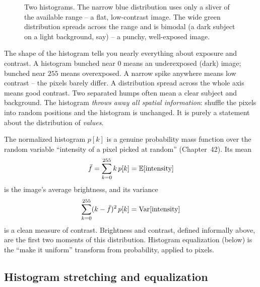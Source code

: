 \begin{figure}[H]
\centering
{}
\caption{Two histograms. The narrow blue distribution uses only a sliver of the
available range -- a flat, low-contrast image. The wide green distribution spreads
across the range and is bimodal (a dark subject on a light background, say) -- a
punchy, well-exposed image.}
\label{ch30:fig-hist}
\end{figure}

The shape of the histogram tells you nearly everything about exposure and
contrast. A histogram bunched near $0$ means an underexposed (dark) image; bunched
near $255$ means overexposed. A narrow spike anywhere means low contrast -- the
pixels barely differ. A distribution spread across the whole axis means good
contrast. Two separated humps often mean a clear subject and background.
The histogram \emph{throws away all spatial information}: shuffle the
pixels into random positions and the histogram is unchanged. It is purely a
statement about the distribution of \emph{values}.

\begin{connectionbox}
The normalized histogram $p[k]$ is a genuine probability mass function over the
random variable ``intensity of a pixel picked at random'' (Chapter~42). Its mean
\[
\bar{f} = \sum_{k=0}^{255} k\,p[k] = \operatorname{\mathbb{E}}[\text{intensity}]
\]
is the image's average brightness, and its variance
\[
\sum_{k=0}^{255} (k-\bar f)^2\,p[k] = \operatorname{Var}[\text{intensity}]
\]
is a clean measure of contrast. Brightness and contrast, defined informally above, are
the first two moments of this distribution. Histogram equalization (below) is the
``make it uniform'' transform from probability, applied to pixels.
\end{connectionbox}

\subsection{Histogram stretching and equalization}
\label{ch30:equalization}

